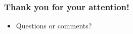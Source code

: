 \documentclass{beamer}
\begin{document}
\begin{frame}
	\frametitle{Thank you for your attention!}
	\begin{itemize}
		\item Questions or comments?
	\end{itemize}
\end{frame}
\end{document}
